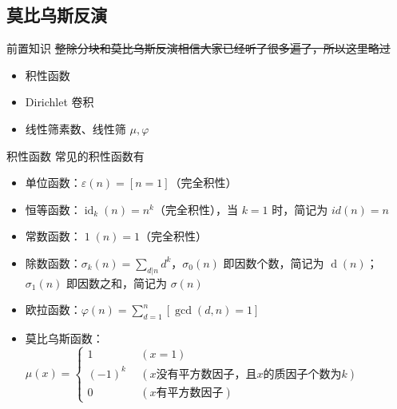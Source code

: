 \documentclass[UTF8]{beamer}
\begin{document}
    \subsection{莫比乌斯反演}
    \begin{frame}{前置知识}
        \sout{整除分块和莫比乌斯反演相信大家已经听了很多遍了，所以这里略过}
        \begin{itemize}
            \item 积性函数
            \item Dirichlet 卷积
            \item 线性筛素数、线性筛 $\mu,\varphi$
        \end{itemize}
    \end{frame}
    \begin{frame}{积性函数}
        常见的积性函数有
        \begin{itemize}
            \item 单位函数：$\varepsilon(n)=[n=1]$（完全积性）\\
            \item 恒等函数：$\operatorname{id}_k(n)=n^k$（完全积性），当 $k=1$ 时，简记为 $id(n)=n$\\
            \item 常数函数：$\operatorname{1}(n)=1$（完全积性）\\
            \item 除数函数：$\sigma_k(n)=\sum_{d|n}d^k$，$\sigma_0(n)$ 即因数个数，简记为 $\operatorname{d}(n)$；$\sigma_1(n)$ 即因数之和，简记为 $\sigma(n)$\\
            \item 欧拉函数：$\varphi(n)=\sum_{d=1}^n[\gcd(d,n)=1]$\\
            \item 莫比乌斯函数：$\mu(x)=\begin{cases}1\ \ &(x=1)\\(-1)^k\ \ &(\text{$x$没有平方数因子，且$x$的质因子个数为$k$})\\0 &(\text{$x$有平方数因子})\end{cases}$
        \end{itemize}
    \end{frame}
\end{document}
